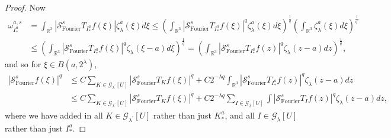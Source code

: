 \documentclass{amsart}%
\theoremstyle{plain}
\numberwithin{equation}{section}
\begin{document}
\begin{proof}
Now%
\begin{align*}
\omega_{I_{\ast}^{a}}^{a,s}  &  =\int_{\mathbb{R}^{3}}\left\vert
\mathcal{S}_{\operatorname*{Fourier}}^{s}T_{I_{\ast}^{a}}f\left(  \xi\right)
\right\vert \zeta_{\lambda}^{a}\left(  \xi\right)  d\xi\leq\left(
\int_{\mathbb{R}^{3}}\left\vert \mathcal{S}_{\operatorname*{Fourier}}%
^{s}T_{I_{\ast}^{a}}f\left(  \xi\right)  \right\vert ^{q}\zeta_{\lambda}%
^{a}\left(  \xi\right)  d\xi\right)  ^{\frac{1}{q}}\left(  \int_{\mathbb{R}%
^{3}}\zeta_{\lambda}^{a}\left(  \xi\right)  d\xi\right)  ^{\frac{1}{q^{\prime
}}}\\
&  \leq\left(  \int_{\mathbb{R}^{3}}\left\vert \mathcal{S}%
_{\operatorname*{Fourier}}^{s}T_{I_{\ast}^{a}}f\left(  \xi\right)  \right\vert
^{q}\zeta_{\lambda}\left(  \xi-a\right)  d\xi\right)  ^{\frac{1}{q}}=\left(
\int_{\mathbb{R}^{3}}\left\vert \mathcal{S}_{\operatorname*{Fourier}}%
^{s}T_{I_{\ast}^{a}}f\left(  z\right)  \right\vert ^{q}\zeta_{\lambda}\left(
z-a\right)  dz\right)  ^{\frac{1}{q}},
\end{align*}
and so for $\xi\in B\left(  a,2^{\lambda}\right)  $,
\begin{align*}
\left\vert \mathcal{S}_{\operatorname*{Fourier}}^{s}f\left(  \xi\right)
\right\vert ^{q}  &  \leq C\sum_{K\in\mathcal{G}_{\lambda^{\prime}}\left[
U\right]  }\left\vert \mathcal{S}_{\operatorname*{Fourier}}^{s}T_{K}f\left(
\xi\right)  \right\vert ^{q}+C2^{-\lambda q}\int_{\mathbb{R}^{3}}\left\vert
\mathcal{S}_{\operatorname*{Fourier}}^{s}T_{I_{\ast}^{a}}f\left(  z\right)
\right\vert ^{q}\zeta_{\lambda}\left(  z-a\right)  dz\\
&  \leq C\sum_{K\in\mathcal{G}_{\lambda^{\prime}}\left[  U\right]  }\left\vert
\mathcal{S}_{\operatorname*{Fourier}}^{s}T_{K}f\left(  \xi\right)  \right\vert
^{q}+C2^{-\lambda q}\sum_{I\in\mathcal{G}_{\lambda}\left[  U\right]  }%
\int\left\vert \mathcal{S}_{\operatorname*{Fourier}}^{s}T_{I}f\left(
z\right)  \right\vert ^{q}\zeta_{\lambda}\left(  z-a\right)  dz,
\end{align*}
where we have added in all $K\in\mathcal{G}_{\lambda^{\prime}}\left[
U\right]  $ rather than just $K_{\ast}^{a}$, and all $I\in\mathcal{G}%
_{\lambda}\left[  U\right]  $ rather than just $I_{\ast}^{a}$.


\end{proof}
\end{document}
